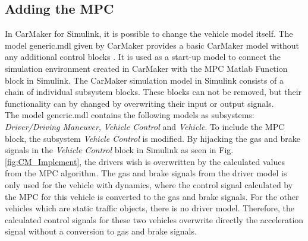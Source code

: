 \documentclass[letterpaper,10pt,conference]{ieeeconf}
\begin{document}
\subsection{Adding the MPC}
In CarMaker for Simulink, it is possible to change the vehicle model itself. The model generic.mdl given by CarMaker provides a basic CarMaker model without any additional control blocks \cite{qsguide}. It is used as a start-up model to connect the simulation environment created in CarMaker with the MPC Matlab Function block in Simulink. The CarMaker simulation model in Simulink consists of a chain of individual subsystem blocks. These blocks can not be removed, but their functionality can by changed by overwriting their input or output signals.\\ \indent
The model generic.mdl contains the following models as subsystems: \textit{Driver/Driving Maneuver}, \textit{Vehicle Control} and \textit{Vehicle}. To include the MPC block, the subsystem \textit{Vehicle Control} is modified. 
By hijacking the gas and brake signals in the \textit{Vehicle Control} block in Simulink as seen in Fig. \ref{fig:CM_Implement}, the drivers wish is overwritten by the calculated values from the MPC algorithm. The gas and brake signals from the driver model is only used for the vehicle with dynamics, where the control signal calculated by the MPC for this vehicle is converted to the gas and brake signals. For the other vehicles which are static traffic objects, there is no driver model. Therefore, the calculated control signals for these two vehicles overwrite directly the acceleration signal without a conversion to gas and brake signals.
\end{document}
